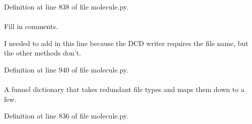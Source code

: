 \-Definition at line 838 of file molecule.\-py.

\hypertarget{classforcebalance_1_1molecule_1_1Molecule_a7887451529cc2b396240b6e4ebfcc2de}{
\paragraph[{fout}]{}}\label{classforcebalance_1_1molecule_1_1Molecule_a7887451529cc2b396240b6e4ebfcc2de}


\-Fill in comments. 

\-I needed to add in this line because the \-D\-C\-D writer requires the file name, but the other methods don't. 

\-Definition at line 940 of file molecule.\-py.

\hypertarget{classforcebalance_1_1molecule_1_1Molecule_a8ee3f691f4ff9c4236afa756ed5482e3}{
\paragraph[{\-Funnel}]{}}\label{classforcebalance_1_1molecule_1_1Molecule_a8ee3f691f4ff9c4236afa756ed5482e3}


\-A funnel dictionary that takes redundant file types and maps them down to a few. 



\-Definition at line 836 of file molecule.\-py.

\hypertarget{classforcebalance_1_1molecule_1_1Molecule_ac0a283e8dd0d63a852311ccdc904e31f}{
\paragraph[{molecules}]{}}\label{classforcebalance_1_1molecule_1_1Molecule_ac0a283e8dd0d63a852311ccdc904e31f}


